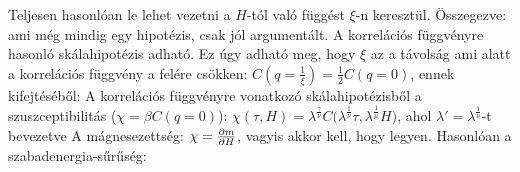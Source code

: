   Teljesen hasonlóan le lehet vezetni a $H$-tól való függést $\xi$-n keresztül. Összegezve:
  ami még mindig egy hipotézis, csak jól argumentált. 
  A korrelációs függvényre hasonló skálahipotézis adható. Ez úgy adható meg, hogy $\xi$ az a távolság ami alatt a korrelációs függvény a felére csökken: $C(q=\frac{1}{\xi})=\frac{1}{2}C(q=0)$, ennek kifejtéséből:
  A korrelációs függvényre vonatkozó skálahipotézisből a szuszceptibilitás ($\chi=\beta C(q=0)$): $\chi(\tau,H)=\lambda^{\frac{\gamma}{\nu}}C\big(\lambda^{\frac{1}{\nu}}\tau,\lambda^{\frac{1}{\mu}}H\big)$, ahol $\lambda'=\lambda^{\frac{1}{\nu}}$-t bevezetve
  A mágnesezettség: $\chi=\frac{\partial m}{\partial H}$, vagyis akkor 
  kell, hogy legyen. Hasonlóan a szabadenergia-sűrűség:
  
